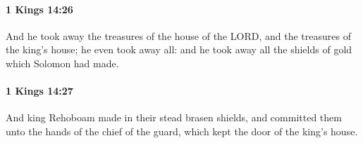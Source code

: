 		\paragraph{1 Kings 14:26} %
			\label{1KINGS-14-26}

			And he took away the treasures of the house of the LORD, and the treasures of the king’s house; he even took away all: and he took away all the shields of gold which Solomon had made.


		\paragraph{1 Kings 14:27} %
			\label{1KINGS-14-27}

			And king Rehoboam made in their stead brasen shields, and committed them unto the hands of the chief of the guard, which kept the door of the king’s house.



